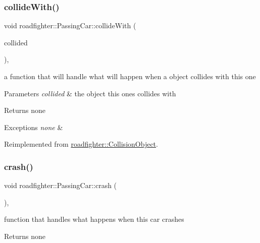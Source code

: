 \subsubsection{\texorpdfstring{collide\+With()}{collideWith()}}
{\footnotesize\ttfamily void roadfighter\+::\+Passing\+Car\+::collide\+With (\begin{DoxyParamCaption}\item[{std\+::shared\+\_\+ptr$<$ \hyperlink{classroadfighter_1_1CollisionObject}{Collision\+Object} $>$ \&}]{collided }\end{DoxyParamCaption})\hspace{0.3cm}{\ttfamily [override]}, {\ttfamily [virtual]}}

a function that will handle what will happen when a object collides with this one 
\begin{DoxyParams}{Parameters}
{\em collided} & the object this ones collides with \\
\hline
\end{DoxyParams}
\begin{DoxyReturn}{Returns}
none 
\end{DoxyReturn}

\begin{DoxyExceptions}{Exceptions}
{\em none} & \\
\hline
\end{DoxyExceptions}


Reimplemented from \hyperlink{classroadfighter_1_1CollisionObject_a9eba85551432f548f2a0c20217a60f42}{roadfighter\+::\+Collision\+Object}.

\mbox{\label{classroadfighter_1_1PassingCar_a5c437fb5164d2735881a469650db048d}} 
\subsubsection{\texorpdfstring{crash()}{crash()}}
{\footnotesize\ttfamily void roadfighter\+::\+Passing\+Car\+::crash (\begin{DoxyParamCaption}{ }\end{DoxyParamCaption})\hspace{0.3cm}{\ttfamily [override]}, {\ttfamily [virtual]}}

function that handles what happens when this car crashes \begin{DoxyReturn}{Returns}
none 
\end{DoxyReturn}


